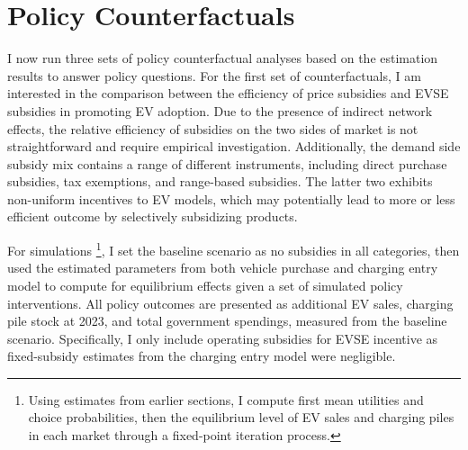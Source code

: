 \documentclass[12pt]{article}
\begin{document}
\section{Policy Counterfactuals}

\hspace*{\parindent} I now run three sets of policy counterfactual analyses based on the estimation results to answer policy questions.
For the first set of counterfactuals, I am interested in the comparison between the efficiency of price subsidies and EVSE subsidies in promoting EV adoption.
Due to the presence of indirect network effects, the relative efficiency of subsidies on the two sides of market is not straightforward and require empirical investigation.
Additionally, the demand side subsidy mix contains a range of different instruments, including direct purchase subsidies, tax exemptions, and range-based subsidies.
The latter two exhibits non-uniform incentives to EV models, which may potentially lead to more or less efficient outcome by selectively subsidizing products.

For simulations \footnote{Using estimates from earlier sections, I compute first mean utilities and choice probabilities, then the equilibrium level of EV sales and charging piles in each market through a fixed-point iteration process.}, 
I set the baseline scenario as no subsidies in all categories, then used the estimated parameters from both vehicle purchase and charging entry model to compute for equilibrium effects given a set of simulated policy interventions.
All policy outcomes are presented as additional EV sales, charging pile stock at 2023, and total government spendings, measured from the baseline scenario.
Specifically, I only include operating subsidies for EVSE incentive as fixed-subsidy estimates from the charging entry model were negligible.
\end{document}

